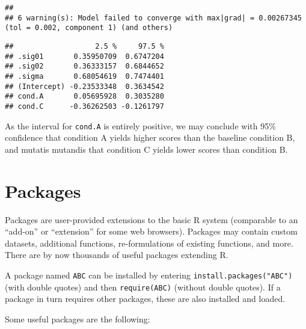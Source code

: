 \documentclass[]{book}
\begin{document}
\begin{verbatim}
## 
## 6 warning(s): Model failed to converge with max|grad| = 0.00267345 (tol = 0.002, component 1) (and others)
\end{verbatim}

\begin{verbatim}
##                   2.5 %     97.5 %
## .sig01       0.35950709  0.6747204
## .sig02       0.36333157  0.6844652
## .sigma       0.68054619  0.7474401
## (Intercept) -0.23533348  0.3634542
## cond.A       0.05695928  0.3035280
## cond.C      -0.36262503 -0.1261797
\end{verbatim}

As the interval for \texttt{cond.A} is entirely
positive, we may conclude with 95\% confidence that condition A yields
higher scores than the baseline condition B, and mutatis mutandis that
condition C yields lower scores than condition B.

\hypertarget{ch:packages}{%
\chapter{Packages}\label{ch:packages}}

Packages are user-provided extensions to the basic R
system (comparable to an ``add-on'' or ``extension'' for some web browsers).
Packages
may contain custom datasets, additional functions, re-formulations of
existing functions, and more. There are by now thousands of useful
packages extending R.

A package named \texttt{ABC} can be installed by
entering \texttt{install.packages("ABC")} (with double quotes) and then \texttt{require(ABC)} (without double quotes).
If a package in turn requires other packages, these are also installed
and loaded.

Some useful packages are the following:
\end{document}
